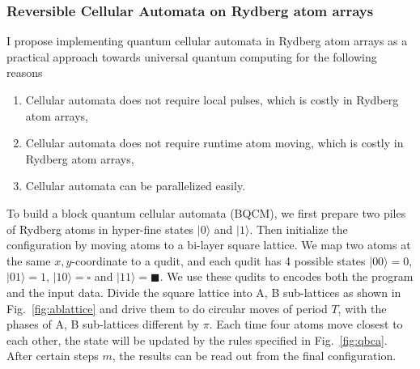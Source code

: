 \documentclass[a4paper]{article}
\newcommand*\circled[1]{\tikz[baseline=(char.base)]{
            \node[shape=circle,draw,inner sep=1pt] (char) {#1};}}
\newcommand{\<}{\langle}
\renewcommand{\>}{\rangle}
\begin{document}
\subsubsection{Reversible Cellular Automata on Rydberg atom arrays}
I propose implementing quantum cellular automata in Rydberg atom arrays as a practical approach towards universal quantum computing for the following reasons
\begin{enumerate}
    \item Cellular automata does not require local pulses, which is costly in Rydberg atom arrays,
    \item Cellular automata does not require runtime atom moving, which is costly in Rydberg atom arrays,
    \item Cellular automata can be parallelized easily.
\end{enumerate}

To build a block quantum cellular automata (BQCM), \circled{1} we first prepare two piles of Rydberg atoms in hyper-fine states $|0\rangle$ and $|1\rangle$.
\circled{2} Then initialize the configuration by moving atoms to a bi-layer square lattice. We map two atoms at the same $x,y$-coordinate to a qudit, and each qudit has 4 possible states $|00\rangle = 0$, $|01\rangle=1$, $|10\rangle=\square$ and $|11\rangle=\blacksquare$.
We use these qudits to encodes both the program and the input data.
\circled{3} Divide the square lattice into A, B sub-lattices as shown in Fig.~\ref{fig:ablattice} and drive them to do circular moves of period $T$, with the phases of A, B sub-lattices different by $\pi$.
Each time four atoms move closest to each other, the state will be updated by the rules specified in Fig.~\ref{fig:qbca}. After certain steps $m$, the results can be read out from the final configuration.
\end{document}
